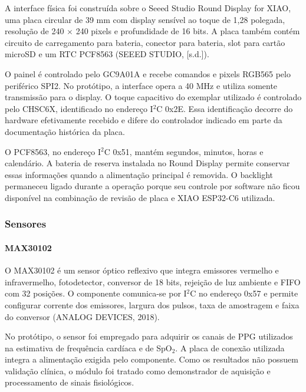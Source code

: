 \documentclass[a4paper,12pt]{article}
\begin{document}
A interface f\'isica foi constru\'ida sobre o Seeed Studio Round Display for XIAO, uma placa circular de 39 mm com display sens\'ivel ao toque de 1,28 polegada, resolu\c{c}\~ao de 240 $\times$ 240 pixels e profundidade de 16 bits. A placa tamb\'em cont\'em circuito de carregamento para bateria, conector para bateria, slot para cart\~ao microSD e um RTC PCF8563 (SEEED STUDIO, [s.d.]).


O painel \'e controlado pelo GC9A01A e recebe comandos e pixels RGB565 pelo perif\'erico SPI2. No prot\'otipo, a interface opera a 40 MHz e utiliza somente transmiss\~ao para o display. O toque capacitivo do exemplar utilizado \'e controlado pelo CHSC6X, identificado no endere\c{c}o I$^2$C 0x2E. Essa identifica\c{c}\~ao decorre do hardware efetivamente recebido e difere do controlador indicado em parte da documenta\c{c}\~ao hist\'orica da placa.


O PCF8563, no endere\c{c}o I$^2$C 0x51, mant\'em segundos, minutos, horas e calend\'ario. A bateria de reserva instalada no Round Display permite conservar essas informa\c{c}\~oes quando a alimenta\c{c}\~ao principal \'e removida. O backlight permaneceu ligado durante a opera\c{c}\~ao porque seu controle por software n\~ao ficou dispon\'ivel na combina\c{c}\~ao de revis\~ao de placa e XIAO ESP32-C6 utilizada.


\subsubsection{Sensores}


\paragraph{MAX30102}


O MAX30102 \'e um sensor \'optico reflexivo que integra emissores vermelho e infravermelho, fotodetector, conversor de 18 bits, rejei\c{c}\~ao de luz ambiente e FIFO com 32 posi\c{c}\~oes. O componente comunica-se por I$^2$C no endere\c{c}o 0x57 e permite configurar corrente dos emissores, largura dos pulsos, taxa de amostragem e faixa do conversor (ANALOG DEVICES, 2018).


No prot\'otipo, o sensor foi empregado para adquirir os canais de PPG utilizados na estimativa de frequ\^encia card\'iaca e de SpO$_2$. A placa de conex\~ao utilizada integra a alimenta\c{c}\~ao exigida pelo componente. Como os resultados n\~ao possuem valida\c{c}\~ao cl\'inica, o m\'odulo foi tratado como demonstrador de aquisi\c{c}\~ao e processamento de sinais fisiol\'ogicos.
\end{document}
